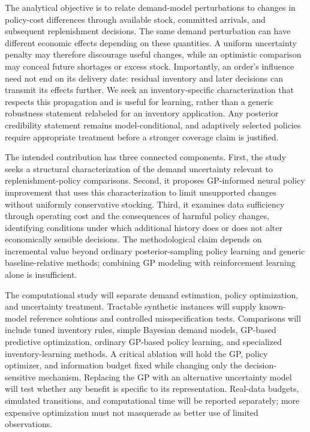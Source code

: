 The analytical objective is to relate demand-model perturbations to changes in policy-cost differences through available stock, committed arrivals, and subsequent replenishment decisions. The same demand perturbation can have different economic effects depending on these quantities. A uniform uncertainty penalty may therefore discourage useful changes, while an optimistic comparison may conceal future shortages or excess stock. Importantly, an order's influence need not end on its delivery date: residual inventory and later decisions can transmit its effects further. We seek an inventory-specific characterization that respects this propagation and is useful for learning, rather than a generic robustness statement relabeled for an inventory application. Any posterior credibility statement remains model-conditional, and adaptively selected policies require appropriate treatment before a stronger coverage claim is justified.

The intended contribution has three connected components. First, the study seeks a structural characterization of the demand uncertainty relevant to replenishment-policy comparisons. Second, it proposes GP-informed neural policy improvement that uses this characterization to limit unsupported changes without uniformly conservative stocking. Third, it examines data sufficiency through operating cost and the consequences of harmful policy changes, identifying conditions under which additional history does or does not alter economically sensible decisions. The methodological claim depends on incremental value beyond ordinary posterior-sampling policy learning and generic baseline-relative methods; combining GP modeling with reinforcement learning alone is insufficient.

The computational study will separate demand estimation, policy optimization, and uncertainty treatment. Tractable synthetic instances will supply known-model reference solutions and controlled misspecification tests. Comparisons will include tuned inventory rules, simple Bayesian demand models, GP-based predictive optimization, ordinary GP-based policy learning, and specialized inventory-learning methods. A critical ablation will hold the GP, policy optimizer, and information budget fixed while changing only the decision-sensitive mechanism. Replacing the GP with an alternative uncertainty model will test whether any benefit is specific to its representation. Real-data budgets, simulated transitions, and computational time will be reported separately; more expensive optimization must not masquerade as better use of limited observations.

